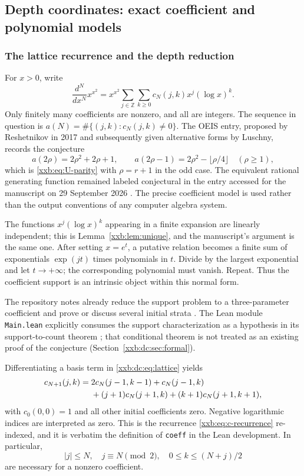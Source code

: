 \documentclass[11pt,a4paper]{article}
\numberwithin{equation}{section}
\theoremstyle{definition}
\theoremstyle{remark}
\theoremstyle{plain}
\newcommand{\Z}{\mathbb Z}
\begin{document}
\subsection{Depth coordinates: exact coefficient and polynomial models}\label{xxb:dc:sec:models}

\subsubsection{The lattice recurrence and the depth reduction}
For $x>0$, write
\begin{equation}\label{xxb:dc:eq:lattice}
 \frac{d^N}{dx^N}x^{x^2}
 =x^{x^2}\sum_{j\in\Z}\sum_{k\ge0}c_N(j,k)x^j(\log x)^k.
\end{equation}
Only finitely many coefficients are nonzero, and all are integers.  The
sequence in question is $a(N)=\#\{(j,k):c_N(j,k)\ne0\}$.  The OEIS entry,
proposed by Reshetnikov in 2017 and subsequently given alternative forms by
Luschny, records the conjecture
\begin{equation}\label{xxb:dc:eq:countconj}
 a(2\rho)=2\rho^2+2\rho+1,\qquad
 a(2\rho-1)=2\rho^2-\lfloor \rho/4\rfloor\quad(\rho\ge1),
\end{equation}
which is \eqref{xxb:eq:U-parity} with $\rho=r+1$ in the odd case.  The
equivalent rational generating function remained labeled conjectural in the
entry accessed for the manuscript on 29 September 2026 \cite{oeis290268}.
The precise coefficient model is used rather than the output conventions of
any computer algebra system.

The functions $x^j(\log x)^k$ appearing in a finite expansion are linearly
independent; this is Lemma~\ref{xxb:lem:unique}, and the manuscript's
argument is the same one.  After setting $x=e^t$, a putative relation becomes a
finite sum of exponentials $\exp(jt)$ times polynomials in $t$.  Divide by the
largest exponential and let $t\to+\infty$; the corresponding polynomial must
vanish.  Repeat.  Thus the coefficient support is an intrinsic object within
this normal form.

The repository notes already reduce the support problem to a three-parameter
coefficient and prove or discuss several initial strata \cite{xxbdc-notes}.
The Lean module \texttt{Main.lean} explicitly consumes the support
characterization as a hypothesis in its support-to-count theorem
\cite{xxbdc-main}; that conditional theorem is not treated as an existing
proof of the conjecture (Section~\ref{xxb:dc:sec:formal}).

Differentiating a basis term in \eqref{xxb:dc:eq:lattice} yields
\begin{align}\label{xxb:dc:eq:rec-lattice}
 c_{N+1}(j,k)={}&2c_N(j-1,k-1)+c_N(j-1,k)\\
 &+(j+1)c_N(j+1,k)+(k+1)c_N(j+1,k+1),\notag
\end{align}
with $c_0(0,0)=1$ and all other initial coefficients zero.  Negative
logarithmic indices are interpreted as zero.  This is the recurrence
\eqref{xxb:eq:c-recurrence} re-indexed, and it is verbatim the definition of
\texttt{coeff} in the Lean development.  In particular,
\[
 |j|\le N,\quad j\equiv N\pmod2,\quad 0\le k\le(N+j)/2
\]
are necessary for a nonzero coefficient.
\end{document}
